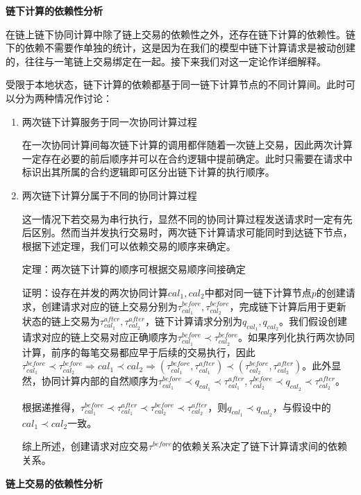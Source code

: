 \noindent\textbf{链下计算的依赖性分析}

在链上链下协同计算中除了链上交易的依赖性之外，还存在链下计算的依赖性。链下的依赖不需要作单独的统计，这是因为在我们的模型中链下计算请求是被动创建的，往往与一笔链上交易绑定在一起。接下来我们对这一定论作详细解释。

受限于本地状态，链下计算的依赖都基于同一链下计算节点的不同计算间。此时可以分为两种情况作讨论：
\begin{enumerate}
    \item 两次链下计算服务于同一次协同计算过程
    
    在一次协同计算间每次链下计算的调用都伴随着一次链上交易，因此两次计算一定存在必要的前后顺序并可以在合约逻辑中提前确定。此时只需要在请求中标识出其所属的合约逻辑即可区分出链下计算的执行顺序。
    \item 两次链下计算分属于不同的协同计算过程
    
    这一情况下若交易为串行执行，显然不同的协同计算过程发送请求时一定有先后区别。然而当并发执行交易时，两次链下计算请求可能同时到达链下节点，根据下述定理，我们可以依赖交易的顺序来确定。

    定理：两次链下计算的顺序可根据交易顺序间接确定

    证明：设存在并发的两次协同计算${cal}_1, {cal}_2$中都对同一链下计算节点$p$的创建请求，创建请求对应的链上交易分别为$\tau_{{cal}_1}^{before}, \tau_{{cal}_2}^{before}$，完成链下计算后用于更新状态的链上交易为$\tau_{{cal}_1}^{after}, \tau_{{cal}_2}^{after}$，链下计算请求分别为$q_{{cal}_1}, q_{{cal}_2}$。我们假设创建请求对应的链上交易对应正确顺序为$\tau_{{cal}_1}^{before} \prec \tau_{{cal}_2}^{before}$。如果序列化执行两次协同计算，前序的每笔交易都应早于后续的交易执行，因此$\tau_{{cal}_1}^{before} \prec \tau_{{cal}_2}^{before} \Rightarrow {cal}_1\prec{cal}_2 \Rightarrow (\tau_{{cal}_1}^{before}, \tau_{{cal}_1}^{after})\prec (\tau_{{cal}_2}^{before},\tau_{{cal}_2}^{after}) $。此外显然，协同计算内部的自然顺序为$\tau_{{cal}_1}^{before}\prec q_{{cal}_1} \prec \tau_{{cal}_1}^{after}, \tau_{{cal}_2}^{before}\prec q_{{cal}_2} \prec \tau_{{cal}_2}^{after}$。
    
    根据递推得，$\tau_{{cal}_1}^{before} \prec \tau_{{cal}_1}^{after} \prec \tau_{{cal}_2}^{before} \prec \tau_{{cal}_2}^{after}$，则$q_{{cal}_1} \prec q_{{cal}_2}$，与假设中的${cal}_1\prec{cal}_2$一致。
    
    综上所述，创建请求对应交易$\tau^{before}$的依赖关系决定了链下计算请求间的依赖关系。
\end{enumerate}

\noindent\textbf{链上交易的依赖性分析}


